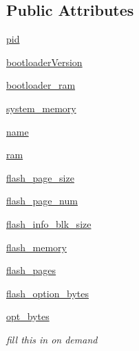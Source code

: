 \subsection*{Public Attributes}
\begin{DoxyCompactItemize}
\item 
\hyperlink{classstm__tools_1_1serialflasher_1_1devices_1_1DeviceType_ac47ca0713353d3fc9435a4f208f6b9a3}{pid}
\item 
\hyperlink{classstm__tools_1_1serialflasher_1_1devices_1_1DeviceType_af9435dc9b903cfa272f9b7caa56c7395}{bootloader\+Version}
\item 
\hyperlink{classstm__tools_1_1serialflasher_1_1devices_1_1DeviceType_a6c37743f24bd50c6555534138bb06609}{bootloader\+\_\+ram}
\item 
\hyperlink{classstm__tools_1_1serialflasher_1_1devices_1_1DeviceType_a8ee7951d8a8b884cd0e3e96ff0e044c9}{system\+\_\+memory}
\item 
\hyperlink{classstm__tools_1_1serialflasher_1_1devices_1_1DeviceType_ab74e6bf80237ddc4109968cedc58c151}{name}
\item 
\hyperlink{classstm__tools_1_1serialflasher_1_1devices_1_1DeviceType_a734379e382de4feb0dce07cb1061ef48}{ram}
\item 
\hyperlink{classstm__tools_1_1serialflasher_1_1devices_1_1DeviceType_a2dad30d94d39cd71e17e3dd0c0d0a56f}{flash\+\_\+page\+\_\+size}
\item 
\hyperlink{classstm__tools_1_1serialflasher_1_1devices_1_1DeviceType_a9540d15c338a785998389ac085d63d60}{flash\+\_\+page\+\_\+num}
\item 
\hyperlink{classstm__tools_1_1serialflasher_1_1devices_1_1DeviceType_ae9e107caabf7796d774e3b9dc66242f6}{flash\+\_\+info\+\_\+blk\+\_\+size}
\item 
\hyperlink{classstm__tools_1_1serialflasher_1_1devices_1_1DeviceType_adead9432d676c0ea71798ca6d28f0dc5}{flash\+\_\+memory}
\item 
\hyperlink{classstm__tools_1_1serialflasher_1_1devices_1_1DeviceType_a7ee6d57cdb63ffd25b774bc45ad88bdd}{flash\+\_\+pages}
\item 
\hyperlink{classstm__tools_1_1serialflasher_1_1devices_1_1DeviceType_ae0dcda22a9424b46b3b203906bff637d}{flash\+\_\+option\+\_\+bytes}
\item 
\hyperlink{classstm__tools_1_1serialflasher_1_1devices_1_1DeviceType_ad14913aeb6f779e1f7d36afffd23d781}{opt\+\_\+bytes}
\begin{DoxyCompactList}\small\item\em fill this in on demand \end{DoxyCompactList}\end{DoxyCompactItemize}
